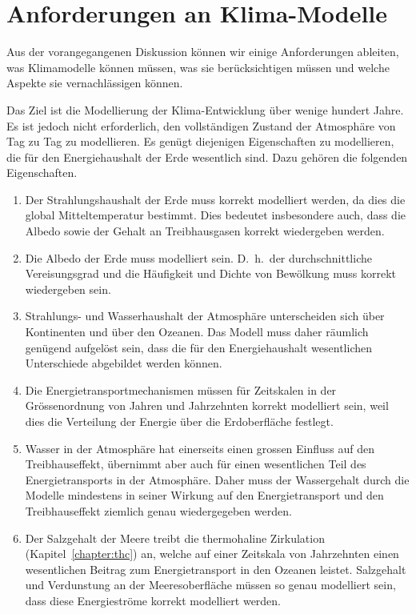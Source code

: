 %
%
%

\section{Anforderungen an Klima-Modelle\label{section:anforderungen}}
Aus der vorangegangenen Diskussion können wir einige Anforderungen
ableiten, was Klimamodelle können müssen, was sie berücksichtigen
müssen und welche Aspekte sie vernachlässigen können.

Das Ziel ist die Modellierung der Klima-Entwicklung über wenige
hundert Jahre.
Es ist jedoch nicht erforderlich, den vollständigen Zustand der
Atmosphäre von Tag zu Tag zu modellieren.
Es genügt diejenigen Eigenschaften zu modellieren, die 
für den Energiehaushalt der Erde wesentlich sind.
Dazu gehören die folgenden Eigenschaften.
\begin{enumerate}
\item
Der Strahlungshaushalt der Erde muss korrekt modelliert werden,
da dies die global Mitteltemperatur bestimmt.
Dies bedeutet insbesondere auch, dass die Albedo sowie der Gehalt an
Treibhausgasen korrekt wiedergeben werden.
\item
Die Albedo der Erde muss modelliert sein. 
D.~h.~der durchschnittliche Vereisungsgrad und die Häufigkeit und
Dichte von Bewölkung muss korrekt wiedergeben sein.
\item
Strahlungs- und Wasserhaushalt der Atmosphäre unterscheiden sich
über Kontinenten und über den Ozeanen.
Das Modell muss daher räumlich genügend aufgelöst sein, dass die
für den Energiehaushalt wesentlichen Unterschiede abgebildet
werden können.
\item
Die Energietransportmechanismen müssen für Zeitskalen in der Grössenordnung
von Jahren und Jahrzehnten korrekt modelliert sein, weil dies die
Verteilung der Energie über die Erdoberfläche festlegt.
\item
Wasser in der Atmosphäre hat einerseits einen grossen Einfluss auf
den Treibhauseffekt, übernimmt aber auch für einen wesentlichen Teil
des Energietransports in der Atmosphäre.
Daher muss der Wassergehalt durch die Modelle mindestens in seiner
Wirkung auf den Energietransport und den Treibhauseffekt
ziemlich genau wiedergegeben werden.
\item
Der Salzgehalt der Meere treibt die thermohaline Zirkulation
(Kapitel~\ref{chapter:thc})
an, welche
auf einer Zeitskala von Jahrzehnten einen wesentlichen Beitrag zum
Energietransport in den Ozeanen leistet.
Salzgehalt und Verdunstung an der Meeresoberfläche müssen so genau
modelliert sein, dass diese Energieströme korrekt modelliert werden.
\end{enumerate}

